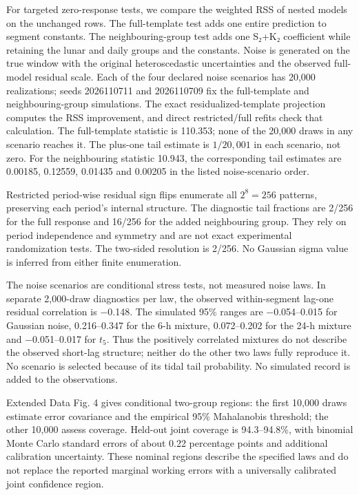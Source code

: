 \documentclass[
  12pt,
  a4paper,
]{article}
\begin{document}
For targeted zero-response tests, we compare the weighted RSS of nested
models on the unchanged rows. The full-template test adds one entire
prediction to segment constants. The neighbouring-group test adds one
S₂+K₂ coefficient while retaining the lunar and daily groups and the
constants. Noise is generated on the true window with the original
heteroscedastic uncertainties and the observed full-model residual
scale. Each of the four declared noise scenarios has 20,000
realizations; seeds 2026110711 and 2026110709 fix the full-template and
neighbouring-group simulations. The exact residualized-template
projection computes the RSS improvement, and direct restricted/full
refits check that calculation. The full-template statistic is 110.353;
none of the 20,000 draws in any scenario reaches it. The plus-one tail
estimate is \(1/20,001\) in each scenario, not zero. For the
neighbouring statistic 10.943, the corresponding tail estimates are
0.00185, 0.12559, 0.01435 and 0.00205 in the listed noise-scenario
order.

Restricted period-wise residual sign flips enumerate all \(2^8=256\)
patterns, preserving each period's internal structure. The diagnostic
tail fractions are 2/256 for the full response and 16/256 for the added
neighbouring group. They rely on period independence and symmetry and
are not exact experimental randomization tests. The two-sided resolution
is 2/256. No Gaussian sigma value is inferred from either finite
enumeration.

The noise scenarios are conditional stress tests, not measured noise
laws. In separate 2,000-draw diagnostics per law, the observed
within-segment lag-one residual correlation is −0.148. The simulated
95\% ranges are −0.054--0.015 for Gaussian noise, 0.216--0.347 for the
6-h mixture, 0.072--0.202 for the 24-h mixture and −0.051--0.017 for
\(t_5\). Thus the positively correlated mixtures do not describe the
observed short-lag structure; neither do the other two laws fully
reproduce it. No scenario is selected because of its tidal tail
probability. No simulated record is added to the observations.

Extended Data Fig. 4 gives conditional two-group regions: the first
10,000 draws estimate error covariance and the empirical 95\%
Mahalanobis threshold; the other 10,000 assess coverage. Held-out joint
coverage is 94.3--94.8\%, with binomial Monte Carlo standard errors of
about 0.22 percentage points and additional calibration uncertainty.
These nominal regions describe the specified laws and do not replace the
reported marginal working errors with a universally calibrated joint
confidence region.
\end{document}
